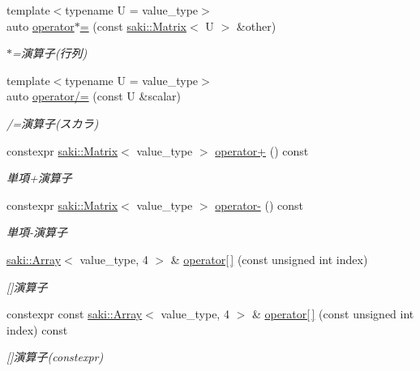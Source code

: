\begin{DoxyCompactItemize}
{\footnotesize template$<$typename U  = value\+\_\+type$>$ }\\auto \mbox{\hyperlink{classsaki_1_1_matrix_af76500609a5175d39f9359e989401e71}{operator$\ast$=}} (const \mbox{\hyperlink{classsaki_1_1_matrix}{saki\+::\+Matrix}}$<$ U $>$ \&other)
\begin{DoxyCompactList}\small\item\em $\ast$=演算子(行列) \end{DoxyCompactList}\item 
{\footnotesize template$<$typename U  = value\+\_\+type$>$ }\\auto \mbox{\hyperlink{classsaki_1_1_matrix_a12f386d5595d02c11a8a7af642183c6c}{operator/=}} (const U \&scalar)
\begin{DoxyCompactList}\small\item\em /=演算子(スカラ) \end{DoxyCompactList}\item 
constexpr \mbox{\hyperlink{classsaki_1_1_matrix}{saki\+::\+Matrix}}$<$ value\+\_\+type $>$ \mbox{\hyperlink{classsaki_1_1_matrix_a4ad581da47941ff512c0c6e26295930d}{operator+}} () const
\begin{DoxyCompactList}\small\item\em 単項+演算子 \end{DoxyCompactList}\item 
constexpr \mbox{\hyperlink{classsaki_1_1_matrix}{saki\+::\+Matrix}}$<$ value\+\_\+type $>$ \mbox{\hyperlink{classsaki_1_1_matrix_a2c5f20009484a43c60cb80fc3db7447a}{operator-\/}} () const
\begin{DoxyCompactList}\small\item\em 単項-\/演算子 \end{DoxyCompactList}\item 
\mbox{\hyperlink{classsaki_1_1_array}{saki\+::\+Array}}$<$ value\+\_\+type, 4 $>$ \& \mbox{\hyperlink{classsaki_1_1_matrix_a90b46906226e931a7dadfcff12726dbb}{operator\mbox{[}$\,$\mbox{]}}} (const unsigned int index)
\begin{DoxyCompactList}\small\item\em \mbox{[}\mbox{]}演算子 \end{DoxyCompactList}\item 
constexpr const \mbox{\hyperlink{classsaki_1_1_array}{saki\+::\+Array}}$<$ value\+\_\+type, 4 $>$ \& \mbox{\hyperlink{classsaki_1_1_matrix_aa195ec5ec3b7a385b42072885d796b1d}{operator\mbox{[}$\,$\mbox{]}}} (const unsigned int index) const
\begin{DoxyCompactList}\small\item\em \mbox{[}\mbox{]}演算子(constexpr) \end{DoxyCompactList}\item 

\end{DoxyCompactItemize}
